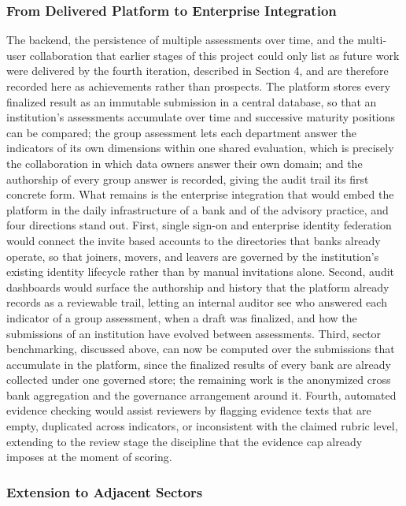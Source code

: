 \subsubsection{From Delivered Platform to Enterprise Integration}

The backend, the persistence of multiple assessments over time, and the multi-user collaboration that earlier stages of this project could only list as future work were delivered by the fourth iteration, described in Section 4, and are therefore recorded here as achievements rather than prospects. The platform stores every finalized result as an immutable submission in a central database, so that an institution's assessments accumulate over time and successive maturity positions can be compared; the group assessment lets each department answer the indicators of its own dimensions within one shared evaluation, which is precisely the collaboration in which data owners answer their own domain; and the authorship of every group answer is recorded, giving the audit trail its first concrete form. What remains is the enterprise integration that would embed the platform in the daily infrastructure of a bank and of the advisory practice, and four directions stand out. First, single sign-on and enterprise identity federation would connect the invite based accounts to the directories that banks already operate, so that joiners, movers, and leavers are governed by the institution's existing identity lifecycle rather than by manual invitations alone. Second, audit dashboards would surface the authorship and history that the platform already records as a reviewable trail, letting an internal auditor see who answered each indicator of a group assessment, when a draft was finalized, and how the submissions of an institution have evolved between assessments. Third, sector benchmarking, discussed above, can now be computed over the submissions that accumulate in the platform, since the finalized results of every bank are already collected under one governed store; the remaining work is the anonymized cross bank aggregation and the governance arrangement around it. Fourth, automated evidence checking would assist reviewers by flagging evidence texts that are empty, duplicated across indicators, or inconsistent with the claimed rubric level, extending to the review stage the discipline that the evidence cap already imposes at the moment of scoring.

\subsubsection{Extension to Adjacent Sectors}

